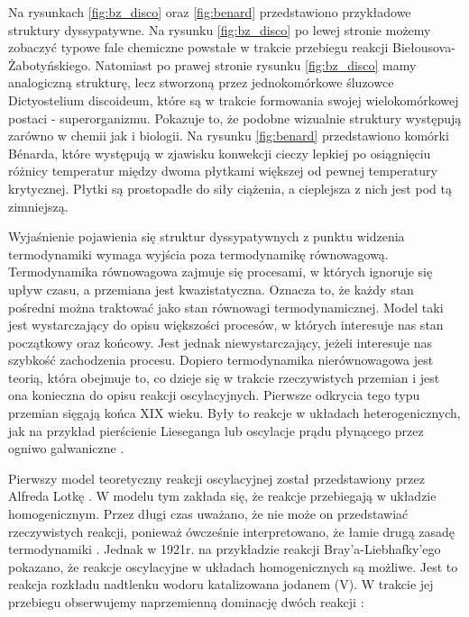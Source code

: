 \documentclass[10pt, a4paper, twoside, onecolumn]{article}
\numberwithin{equation}{section}
\begin{document}
	Na rysunkach \ref{fig:bz_disco} oraz \ref{fig:benard} przedstawiono przykładowe struktury dyssypatywne. Na rysunku \ref{fig:bz_disco} po lewej stronie możemy zobaczyć typowe fale chemiczne powstałe w trakcie przebiegu reakcji Biełousova-Żabotyńskiego. Natomiast po prawej stronie rysunku \ref{fig:bz_disco} mamy analogiczną strukturę, lecz stworzoną przez jednokomórkowe śluzowce Dictyostelium discoideum, które są w trakcie formowania swojej wielokomórkowej postaci - superorganizmu. Pokazuje to, że podobne wizualnie struktury występują zarówno w chemii jak i biologii. Na rysunku \ref{fig:benard} przedstawiono komórki B\'{e}narda, które występują w zjawisku konwekcji cieczy lepkiej po osiągnięciu różnicy temperatur między dwoma płytkami większej od pewnej temperatury krytycznej. Płytki są prostopadłe do siły ciążenia, a cieplejsza z nich jest pod tą zimniejszą. \par
	Wyjaśnienie pojawienia się struktur dyssypatywnych z punktu widzenia termodynamiki wymaga wyjścia poza termodynamikę równowagową. Termodynamika równowagowa zajmuje się procesami, w których ignoruje się upływ czasu, a przemiana jest kwazistatyczna. Oznacza to, że każdy stan pośredni można traktować jako stan równowagi termodynamicznej. Model taki jest wystarczający do opisu większości procesów, %
	w których interesuje nas stan początkowy oraz końcowy. Jest jednak niewystarczający, jeżeli interesuje nas szybkość zachodzenia procesu. Dopiero termodynamika nierównowagowa jest teorią, która obejmuje to, co dzieje się w trakcie rzeczywistych przemian i jest ona konieczna do opisu reakcji oscylacyjnych. Pierwsze odkrycia tego typu przemian sięgają końca XIX wieku. Były to reakcje w układach heterogenicznych, jak na przykład pierścienie Lieseganga lub oscylacje prądu płynącego przez ogniwo galwaniczne \cite{orlik}. \par
	Pierwszy model teoretyczny reakcji oscylacyjnej został przedstawiony przez Alfreda Lotkę \cite{lotka}. W modelu tym zakłada się, że reakcje przebiegają w układzie homogenicznym. Przez długi czas uważano, że nie może on przedstawiać rzeczywistych reakcji, ponieważ ówcześnie interpretowano, że łamie drugą zasadę termodynamiki \cite{orlik_sily_w_przyrodzie}. Jednak w 1921r. na przykładzie reakcji Bray'a-Liebhafky'ego pokazano, że reakcje oscylacyjne w układach homogenicznych są możliwe. Jest to reakcja rozkładu nadtlenku wodoru katalizowana jodanem (V). W trakcie jej przebiegu obserwujemy naprzemienną dominację dwóch reakcji \cite{orlik}:
\end{document}
